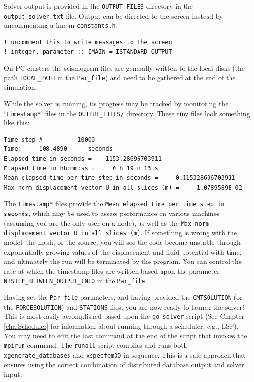 Solver output is provided in the \texttt{OUTPUT\_FILES} directory
in the \texttt{output\_solver.txt} file. Output can be directed to
the screen instead by uncommenting a line in \texttt{constants.h}:
\begin{verbatim}
! uncomment this to write messages to the screen
! integer, parameter :: IMAIN = ISTANDARD_OUTPUT
\end{verbatim}
On PC clusters the seismogram files are generally written to the local
disks (the path \texttt{LOCAL\_PATH} in the \texttt{Par\_file}) and
need to be gathered at the end of the simulation.

While the solver is running, its progress may be tracked by monitoring
the `\texttt{\small timestamp{*}}' files in the \texttt{\small OUTPUT\_FILES/} directory. These tiny
files look something like this:
{\small
\begin{verbatim}
Time step #          10000
Time:     108.4890      seconds
Elapsed time in seconds =    1153.28696703911
Elapsed time in hh:mm:ss =     0 h 19 m 13 s
Mean elapsed time per time step in seconds =     0.115328696703911
Max norm displacement vector U in all slices (m) =     1.0789589E-02
\end{verbatim}
}
The \texttt{\small timestamp{*}} files provide the
\texttt{\small Mean elapsed time per time step in seconds}, which may be used
to assess performance on various machines (assuming you are the only
user on a node), as well as the
\texttt{\small Max norm displacement vector U in all slices~(m)}.
If something is wrong with the
model, the mesh, or the source, you will see the code become unstable
through exponentially growing values of the displacement and fluid
potential with time, and ultimately the run will be terminated by
the program. You can control the rate at which the timestamp files
are written based upon the parameter
\texttt{\small NTSTEP\_BETWEEN\_OUTPUT\_INFO}
in the \texttt{\small Par\_file}.

Having set the \texttt{Par\_file} parameters, and having provided
the \texttt{CMTSOLUTION} (or the \texttt{FORCESOLUTION}) and \texttt{STATIONS}
files, you are now ready to launch the solver! This is most easily
accomplished based upon the \texttt{go\_solver} script (See Chapter
\ref{cha:Scheduler} for information about running through a scheduler,
e.g., LSF). You may need to edit the last command at the end of the
script that invokes the \texttt{mpirun} command. The \texttt{runall}
script compiles and runs both \texttt{xgenerate\_databases} and \texttt{xspecfem3D}
in sequence. This is a safe approach that ensures using the correct
combination of distributed database output and solver input.

